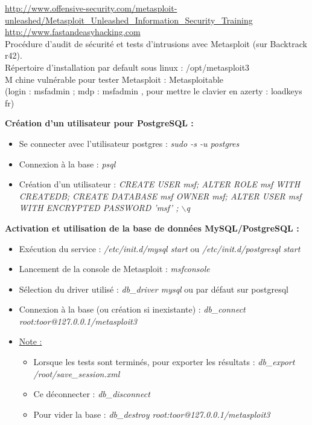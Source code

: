 \documentclass[a4paper,11pt]{article}				    %
\begin{document}
{
\url{http://www.offensive-security.com/metasploit-unleashed/Metasploit_Unleashed_Information_Security_Training}\\
\url{http://www.fastandeasyhacking.com}
}{
\\Proc\'edure d'audit de s\'ecurit\'e et tests d'intrusions avec Metasploit (sur Backtrack r42).\\
R\'epertoire d'installation par default sous linux : /opt/metasploit3\\
M	chine vuln\'erable pour tester Metasploit : Metasploitable\\
(login : msfadmin ; mdp : msfadmin , pour mettre le clavier en azerty : loadkeys fr)
}{
\textbf{Cr\'eation d'un utilisateur pour PostgreSQL :}
\begin{itemize}
	\item Se connecter avec l'utilisateur postgres : {\sl \color{blue}sudo -s -u postgres}
    \item Connexion \`a la base : {\sl \color{blue}psql}
    \item Cr\'eation d'un utilisateur : {\sl \color{blue}\footnotesize CREATE USER msf; ALTER ROLE msf WITH CREATEDB; CREATE DATABASE msf OWNER msf; ALTER USER msf WITH ENCRYPTED PASSWORD 'msf' ; $\backslash$q}
\end{itemize}

\textbf{Activation et utilisation de la base de donn\'ees MySQL/PostgreSQL :}
\begin{itemize}
	\item Ex\'ecution du service : {\sl \color{blue}/etc/init.d/mysql start} ou {\sl \color{blue}/etc/init.d/postgresql start}
	\item Lancement de la console de Metasploit : {\sl \color{blue}msfconsole}
	\item S\'election du driver utilis\'e : {\sl \color{blue}db\_driver mysql} ou par d\'efaut sur postgresql
	\item Connexion \`a la base (ou cr\'eation si inexistante) : {\sl \color{blue}db\_connect root:toor@127.0.0.1/metasploit3}
	\item \underline{Note :}
	\begin{itemize}
		\item Lorsque les tests sont termin\'es, pour exporter les r\'esultats : {\sl \color{blue}db\_export /root/save\_session.xml}
		\item Ce d\'econnecter : {\sl \color{blue}db\_disconnect}
		\item Pour vider la base : {\sl \color{blue}db\_destroy root:toor@127.0.0.1/metasploit3}
	\end{itemize}
\end{itemize}

}
\end{document}

